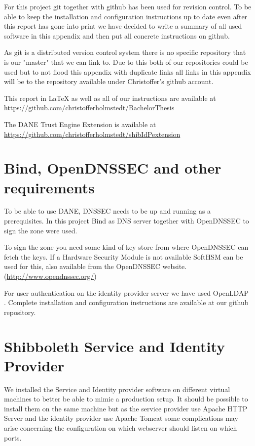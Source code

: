 For this project git together with github has been used for revision control.
To be able to keep the installation and configuration instructions up to date even after this report has gone into print we have decided to write a summary of all used software in this appendix and then put all concrete instructions on github.

As git is a distributed version control system there is no specific repository that is our "master" that we can link to.
Due to this both of our repositories could be used but to not flood this appendix with duplicate links all links in this appendix will be to the repository available under Christoffer's github account.

This report in LaTeX as well as all of our instructions are available at \\
\url{https://github.com/christofferholmstedt/BachelorThesis}

The DANE Trust Engine Extension is available at \\
\url{https://github.com/christofferholmstedt/shibIdPextension}

\section{Bind, OpenDNSSEC and other requirements}
To be able to use DANE, DNSSEC needs to be up and running as a prerequisites.
In this project Bind as DNS server together with OpenDNSSEC to sign the zone were used.

To sign the zone you need some kind of key store from where OpenDNSSEC can fetch the keys.
If a Hardware Security Module is not available SoftHSM can be used for this, also available from the OpenDNSSEC website.
(\url{http://www.opendnssec.org/})

For user authentication on the identity provider server we have used OpenLDAP \cite{website:openldap}.
Complete installation and configuration instructions are available at our github repository.

\section{Shibboleth Service and Identity Provider}
We installed the Service and Identity provider software on different virtual machines to better be able to mimic a production setup.
It should be possible to install them on the same machine but as the service provider use Apache HTTP Server and the identity provider use Apache Tomcat some complications may arise concerning the configuration on which webserver should listen on which ports.

